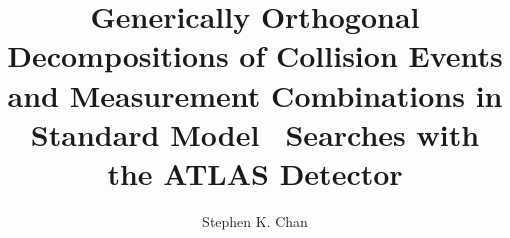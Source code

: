 \title{Generically Orthogonal Decompositions of Collision Events and Measurement Combinations in Standard Model \vhbb\, Searches with the ATLAS Detector}
\author{Stephen K. Chan}





\degreemonth{}


